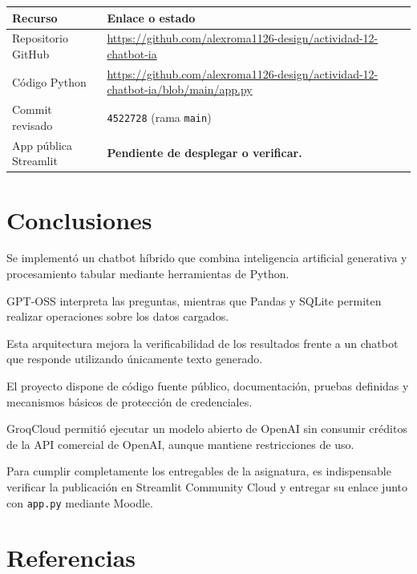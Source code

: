 \documentclass[11pt,a4paper]{article}
\begin{document}
\begin{tabularx}{\textwidth}{@{}p{3cm}X@{}}
\toprule
\textbf{Recurso} & \textbf{Enlace o estado}\\
\midrule

Repositorio GitHub &
\url{https://github.com/alexroma1126-design/actividad-12-chatbot-ia}\\

Código Python &
\url{https://github.com/alexroma1126-design/actividad-12-chatbot-ia/blob/main/app.py}\\

Commit revisado &
\texttt{4522728} (rama \texttt{main})\\

App pública Streamlit &
\textbf{Pendiente de desplegar o verificar.}\\

\bottomrule
\end{tabularx}

\section{Conclusiones}

Se implementó un chatbot híbrido que combina
inteligencia artificial generativa y procesamiento
tabular mediante herramientas de Python.

GPT-OSS interpreta las preguntas, mientras
que Pandas y SQLite permiten realizar operaciones
sobre los datos cargados.

Esta arquitectura mejora la verificabilidad
de los resultados frente a un chatbot
que responde utilizando únicamente texto generado.

El proyecto dispone de código fuente público,
documentación, pruebas definidas y mecanismos
básicos de protección de credenciales.

GroqCloud permitió ejecutar un modelo abierto
de OpenAI sin consumir créditos de la API comercial
de OpenAI, aunque mantiene restricciones de uso.

Para cumplir completamente los entregables
de la asignatura, es indispensable verificar
la publicación en Streamlit Community Cloud
y entregar su enlace junto con \texttt{app.py}
mediante Moodle.

\section*{Referencias}
\end{document}

